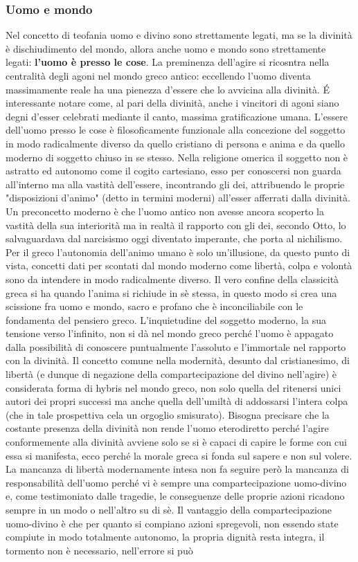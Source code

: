 \documentclass[10pt,a4paper]{article}
\begin{document}
\subsubsection{Uomo e mondo}
Nel concetto di teofania uomo e divino sono strettamente legati, ma se la divinità è dischiudimento del mondo, allora anche uomo e mondo sono strettamente legati: \textbf{l'uomo è presso le cose}. La preminenza dell'agire si ricosntra nella centralità degli agoni nel mondo greco antico: eccellendo l'uomo diventa massimamente reale ha una pienezza d'essere che lo avvicina alla divinità. \'E interessante notare come, al pari della divinità, anche i vincitori di agoni siano degni d'esser celebrati mediante il canto, massima gratificazione umana. L'essere dell'uomo presso le cose è filosoficamente funzionale alla concezione del soggetto in modo radicalmente diverso da quello cristiano di persona e anima e da quello moderno di soggetto chiuso in se stesso. Nella religione omerica il soggetto non è astratto ed autonomo come il cogito cartesiano, esso per conoscersi non guarda all'interno ma alla vastità dell'essere, incontrando gli dei, attribuendo le proprie "disposizioni d'animo" (detto in termini moderni) all'esser afferrati dalla divinità. Un preconcetto moderno è che l'uomo antico non avesse ancora scoperto la vastità della sua interiorità ma in realtà il rapporto con gli dei, secondo Otto, lo salvaguardava dal narcisismo oggi diventato imperante, che porta al nichilismo. Per il greco l'autonomia dell'animo umano è solo un'illusione, da questo punto di vista, concetti dati per scontati dal mondo moderno come libertà, colpa e volontà sono da intendere in modo radicalmente diverso. Il vero confine della classicità greca si ha quando l'anima si richiude in sè stessa, in questo modo si crea una scissione fra uomo e mondo, sacro e profano che è inconciliabile con le fondamenta del pensiero greco. L'inquietudine del soggetto moderno, la sua tensione verso l'infinito, non si dà nel mondo greco perché l'uomo è appagato dalla possibilità di conoscere puntualmente l'assoluto e l'immortale nel rapporto con la divinità. Il concetto comune nella modernità, desunto dal cristianesimo, di libertà (e dunque di negazione della compartecipazione del divino nell'agire) è considerata forma di hybris nel mondo greco, non solo quella del ritenersi unici autori dei propri successi ma anche quella dell'umiltà di addossarsi l'intera colpa (che in tale prospettiva cela un orgoglio smisurato). Bisogna precisare che la costante presenza della divinità non rende l'uomo eterodiretto perché l'agire conformemente alla divinità avviene solo se si è capaci di capire le forme con cui essa si manifesta, ecco perché la morale greca si fonda sul sapere e non sul volere. La mancanza di libertà modernamente intesa non fa seguire però la mancanza di responsabilità dell'uomo perché vi è sempre una compartecipazione uomo-divino e, come testimoniato dalle tragedie, le conseguenze delle proprie azioni ricadono sempre in un modo o nell'altro su di sè. Il vantaggio della compartecipazione uomo-divino è che per quanto si compiano azioni spregevoli, non essendo state compiute in modo totalmente autonomo, la propria dignità resta integra, il tormento non è necessario, nell'errore si può 
\end{document}
